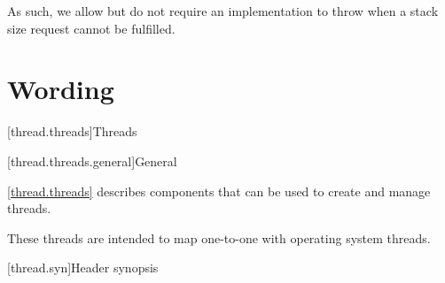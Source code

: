 \documentclass{wg21}
\begin{document}
As such, we allow but do not require an implementation to throw when a stack size request cannot be fulfilled.


\section{Wording}

[thread.threads]{Threads}

[thread.threads.general]{General}

\pnum
\ref{thread.threads} describes components that can be used to create and manage threads.
\begin{note}
    These threads are intended to map one-to-one with operating system threads.
\end{note}

[thread.syn]{Header  synopsis}
\end{document}
